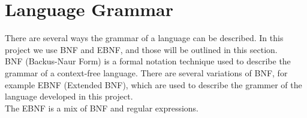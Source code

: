 \section{Language Grammar}
\label{sec:ebnf}

There are several ways the grammar of a language can be described. In this project we use BNF and EBNF, and those will be outlined in this section.\\
BNF (Backus-Naur Form) is a formal notation technique used to describe the grammar of a context-free language. There are several variations of BNF, for example EBNF (Extended BNF), which are used to describe the grammer of the language developed in this project.\\
The EBNF is a mix of BNF and regular expressions.